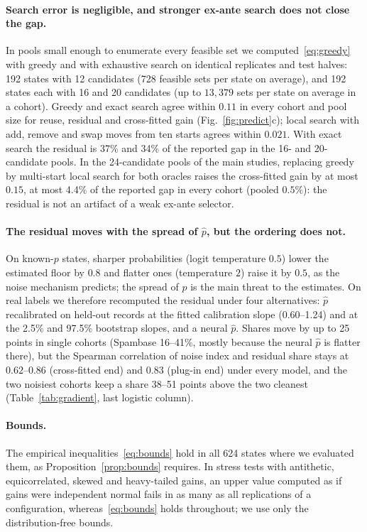 \documentclass[runningheads]{llncs}
\begin{document}
\paragraph{Search error is negligible, and stronger ex-ante search does not close the gap.} In pools small enough to enumerate every feasible set we computed~\eqref{eq:greedy} with greedy and with exhaustive search on identical replicates and test halves: 192 states with 12 candidates (728 feasible sets per state on average), and 192 states each with 16 and 20 candidates (up to $13{,}379$ sets per state on average in a cohort). Greedy and exact search agree within $0.11$ in every cohort and pool size for reuse, residual and cross-fitted gain (Fig.~\ref{fig:predict}c); local search with add, remove and swap moves from ten starts agrees within $0.021$. With exact search the residual is 37\% and 34\% of the reported gap in the 16- and 20-candidate pools. In the 24-candidate pools of the main studies, replacing greedy by multi-start local search for both oracles raises the cross-fitted gain by at most $0.15$, at most 4.4\% of the reported gap in every cohort (pooled $0.5\%$): the residual is not an artifact of a weak ex-ante selector.

\paragraph{The residual moves with the spread of $\hat p$, but the ordering does not.} On known-$p$ states, sharper probabilities (logit temperature $0.5$) lower the estimated floor by $0.8$ and flatter ones (temperature $2$) raise it by $0.5$, as the noise mechanism predicts; the spread of $\hat p$ is the main threat to the estimates. On real labels we therefore recomputed the residual under four alternatives: $\hat p$ recalibrated on held-out records at the fitted calibration slope (0.60--1.24) and at the 2.5\% and 97.5\% bootstrap slopes, and a neural $\hat p$. Shares move by up to 25 points in single cohorts (Spambase 16--41\%, mostly because the neural $\hat p$ is flatter there), but the Spearman correlation of noise index and residual share stays at $0.62$--$0.86$ (cross-fitted end) and $0.83$ (plug-in end) under every model, and the two noisiest cohorts keep a share 38--51 points above the two cleanest (Table~\ref{tab:gradient}, last logistic column).

\paragraph{Bounds.} The empirical inequalities~\eqref{eq:bounds} hold in all 624 states where we evaluated them, as Proposition~\ref{prop:bounds} requires. In stress tests with antithetic, equicorrelated, skewed and heavy-tailed gains, an upper value computed as if gains were independent normal fails in as many as all replications of a configuration, whereas~\eqref{eq:bounds} holds throughout; we use only the distribution-free bounds.
\end{document}
